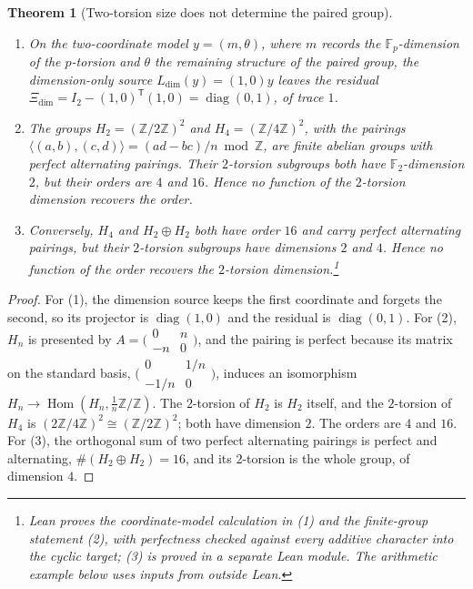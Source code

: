 \documentclass[11pt]{article}
\newtheorem{theorem}{Theorem}[section]
\theoremstyle{definition}
\newcommand{\Z}{\mathbb{Z}}
\begin{document}
\begin{theorem}[Two-torsion size does not determine the paired group]\label{thm:apparatus:dim-sha-shadow}
\leavevmode
\begin{enumerate}
\item On the two-coordinate model $y=(m,\theta)$, where $m$ records the
  $\mathbb F_p$-dimension of the $p$-torsion and $\theta$ the remaining
  structure of the paired group, the dimension-only source
  $L_{\dim}(y)=(1,0)y$ leaves the residual
  $\Xi_{\dim}=I_2-(1,0)^{\mathsf T}(1,0)=\operatorname{diag}(0,1)$, of
  trace $1$.
\item The groups $H_2=(\Z/2\Z)^2$ and $H_4=(\Z/4\Z)^2$, with the pairings
  $\langle(a,b),(c,d)\rangle=(ad-bc)/n\bmod\Z$, are finite abelian groups
  with perfect alternating pairings.  Their $2$-torsion subgroups both
  have $\mathbb F_2$-dimension $2$, but their orders are $4$ and $16$.
  Hence no function of the $2$-torsion dimension recovers the order.
\item Conversely, $H_4$ and $H_2\oplus H_2$ both have order $16$ and
  carry perfect alternating pairings, but their $2$-torsion subgroups
  have dimensions $2$ and $4$.  Hence no function of the order recovers
  the $2$-torsion dimension.\footnote{Lean proves the coordinate-model calculation in (1) and the
finite-group statement (2), with perfectness checked against every
additive character into the cyclic target; (3) is proved in a separate
Lean module.  The arithmetic example below uses inputs from outside
Lean.}
\end{enumerate}
\end{theorem}

\begin{proof}
For (1), the dimension source keeps the first coordinate and forgets the
second, so its projector is $\operatorname{diag}(1,0)$ and the residual is
$\operatorname{diag}(0,1)$.  For (2), $H_n$ is presented by
$A=\bigl(\begin{smallmatrix}0&n\\-n&0\end{smallmatrix}\bigr)$, and the
pairing is perfect because its matrix on the standard basis,
$\bigl(\begin{smallmatrix}0&1/n\\-1/n&0\end{smallmatrix}\bigr)$, induces
an isomorphism $H_n\to\operatorname{Hom}(H_n,\frac1n\Z/\Z)$.  The
$2$-torsion of $H_2$ is $H_2$ itself, and the $2$-torsion of $H_4$ is
$(2\Z/4\Z)^2\cong(\Z/2\Z)^2$; both have dimension $2$.  The orders are
$4$ and $16$.  For (3), the orthogonal sum of two perfect alternating
pairings is perfect and alternating, $\#(H_2\oplus H_2)=16$, and its
$2$-torsion is the whole group, of dimension $4$.
\end{proof}
\end{document}
